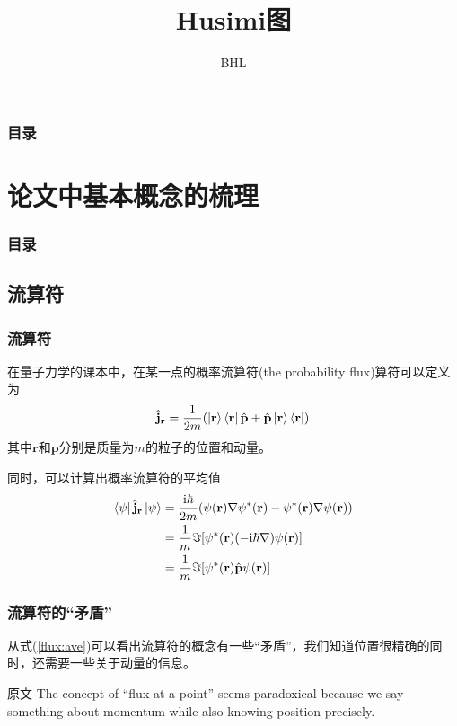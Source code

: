 \documentclass[UTF8]{beamer}
\title{Husimi图}
\author{BHL}
\begin{document}
\frame{\titlepage}
\begin{frame}\frametitle{目录}
    \tableofcontents
\end{frame}
%
\section{论文中基本概念的梳理}
\begin{frame}\frametitle{目录}
    \tableofcontents[currentsection]
\end{frame}
\subsection{流算符}
\begin{frame}\frametitle{流算符}
    在量子力学的课本中，在某一点的概率流算符(the probability flux)算符可以定义为
    \begin{equation}
        \hat{\mathbf{j}}_{\mathbf{r}} = \frac{1}{2m}(\ket{\mathbf{r}}\bra{\mathbf{r}}\hat{\mathbf{p}}+\hat{\mathbf{p}}\ket{\mathbf{r}}\bra{\mathbf{r}})
        \label{flux:def}
    \end{equation}
    其中$\mathbf{r}$和$\mathbf{p}$分别是质量为$m$的粒子的位置和动量。

    同时，可以计算出概率流算符的平均值
    \begin{equation}
        \begin{aligned}
            \bra{\psi}\hat{\mathbf{j}}_{\mathbf{r}}\ket{\psi} & =
            \frac{\mathrm{i}\hbar}{2m}(
            \mathrm{\psi}(\mathbf{r})\nabla\mathrm{\psi}^{*}(\mathbf{r})
            -\mathrm{\psi}^{*}(\mathbf{r})\nabla\mathrm{\psi}(\mathbf{r})
            )                                                                                                                                                   \\
                                                              & =\frac{1}{m}\Im[\mathrm{\psi}^{*}(\mathbf{r})(-\mathrm{i}\hbar\nabla)\mathrm{\psi}(\mathbf{r})] \\
                                                              & =\frac{1}{m}\Im[\mathrm{\psi}^{*}(\mathbf{r})\hat{\mathbf{p}}\mathrm{\psi}(\mathbf{r})]
            \label{flux:ave}
        \end{aligned}
    \end{equation}
\end{frame}
\begin{frame}\frametitle{流算符的“矛盾”}
    从式(\ref{flux:ave})可以看出流算符的概念有一些“矛盾”，我们知道位置很精确的同时，还需要一些关于动量的信息。\\
    \begin{block}{原文\cite{mason2013quantum}}
        The concept of “flux at a point” seems paradoxical because we say something about momentum while also knowing position precisely.
    \end{block}
\end{frame}
\end{document}
